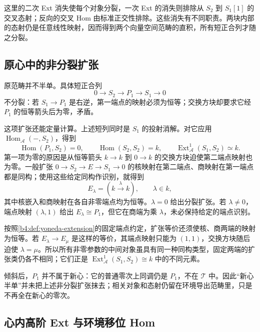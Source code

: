 这里的二次 Ext 消失使每个对象分裂，一次 Ext 的消失则排除从 \(S_2\) 到 \(S_1[1]\) 的交叉态射；反向的交叉 Hom 由标准正交性排除。这些消失有不同职责。两块内部的态射仍是任意线性映射，因而得到两个向量空间范畴的直积，所有短正合列才随之分裂。

\subsection{原心中的非分裂扩张}
\label{b4:subsec:1905:04}

原范畴并不半单。具体短正合列
\[
	0\longrightarrow S_2\longrightarrow P_1\longrightarrow S_1\longrightarrow0
\]
不分裂：若 \(S_1\to P_1\) 是右逆，第一端点的映射必须为恒等；交换方块却要求它经 \(P_1\) 的恒等箭头后为零，矛盾。

\ProseParagraphBreak
这项扩张还能定量计算。上述短列同时是 \(S_1\) 的投射消解。对它应用 \(\operatorname{Hom}_{\mathcal A}(-,S_2)\)，得到
\[
	\operatorname{Hom}(P_1,S_2)=0, \qquad \operatorname{Hom}(S_2,S_2)=k, \qquad \operatorname{Ext}_{\mathcal A}^1(S_1,S_2)\simeq k.
\]
第一项为零的原因是从恒等箭头 \(k\to k\) 到 \(0\to k\) 的交换方块迫使第二端点映射也为零。一般扩张 \(0\to S_2\to E\to S_1\to0\) 的核映射在第二端点、商映射在第一端点都是同构；使用这些给定同构作识别，就得到
\[
	E_\lambda=(k\xrightarrow{\lambda}k),\qquad \lambda\in k,
\]
其中核嵌入和商映射在各自非零端点均为恒等。\(\lambda=0\) 给出分裂扩张。若 \(\lambda\ne0\)，端点映射 \((\lambda,1)\) 给出 \(E_\lambda\cong P_1\)，但它在商端为乘 \(\lambda\)，未必保持给定的端点识别。

\ProseParagraphBreak
按照\cref{b4:def:yoneda-extension}的固定端点约定，扩张等价还须使核、商两端的映射为恒等。若 \(E_\lambda\to E_\mu\) 是这样的等价，其端点映射只能为 \((1,1)\)，交换方块随后迫使 \(\lambda=\mu\)。所以所有非零参数的中间对象虽具有同一种同构类型，固定两端的扩张类仍各不相同；它们正是 \(\operatorname{Ext}_{\mathcal A}^1(S_1,S_2)\cong k\) 中的不同元素。

\ProseParagraphBreak
倾斜后，\(P_1\) 并不属于新心：它的普通零次上同调仍是 \(P_1\)，不在 \(\mathcal T\) 中。因此“新心半单”并未把上述非分裂扩张抹去；相关对象和态射仍留在环境导出范畴里，只是不再全在新心的零次。

\subsection{心内高阶 Ext 与环境移位 Hom}
\label{b4:subsec:1905:05}

